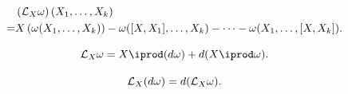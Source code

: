 \documentclass[../main.tex]{subfiles}
\begin{document}
    \begin{corollary}\label{cor:decompose-lie-der-forms}
        \[
        \begin{aligned}
        &\left(\mathcal{L}_{X}\omega\right)(X_1, \dots, X_k)\\
        =&X\left(\omega(X_1, \dots, X_k)\right) - 
        \omega([X, X_1], \dots, X_k) - \dots - 
        \omega(X_1, \dots, [X, X_k]).
        \end{aligned}
        \]
    \end{corollary}
    \begin{theorem}\label{thm:cartan-magic-formula}
        \[
        \lder{X}\omega=X\iprod(d\omega)+d(X\iprod\omega).
        \]
    \end{theorem}
    \begin{corollary}\label{cor:lie-der-commute-ext-der}
        \[
        \mathcal{L}_{X}(d\omega)=d(\mathcal{L}_{X}\omega).
        \]
    \end{corollary}
\end{document}
